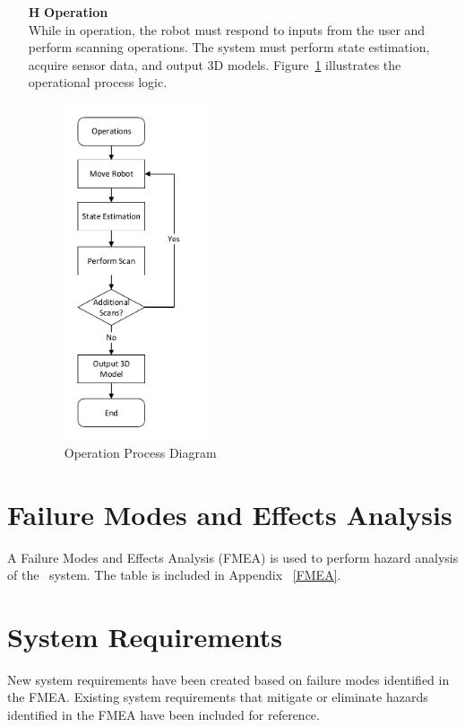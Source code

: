 \documentclass[12pt]{article}
\newcounter{haznum} %
\begin{document}
\begin{itemize}
\item[\textbf{H\refstepcounter{haznum}\thehaznum \label{H2}}] \textbf{Operation}\\
While in operation, the robot must respond to inputs from the user and perform scanning operations. The system must perform state estimation, acquire sensor data, and output 3D models. Figure~\ref{fig_Operation} illustrates the operational process logic.
\begin{figure}[H]
\centering
\includegraphics[width = 0.4\textwidth]{Figures/Operation Processes.pdf}
\caption{Operation Process Diagram}
\label{fig_Operation}
\end{figure}
\end{itemize}

\section{Failure Modes and Effects Analysis}

A Failure Modes and Effects Analysis (FMEA) is used to perform hazard analysis of the \progname ~system. The table is included in Appendix ~\ref{FMEA}.

\section{System Requirements}

New system requirements have been created based on failure modes identified in the FMEA. Existing system requirements that mitigate or eliminate hazards identified in the FMEA have been included for reference.
\end{document}
